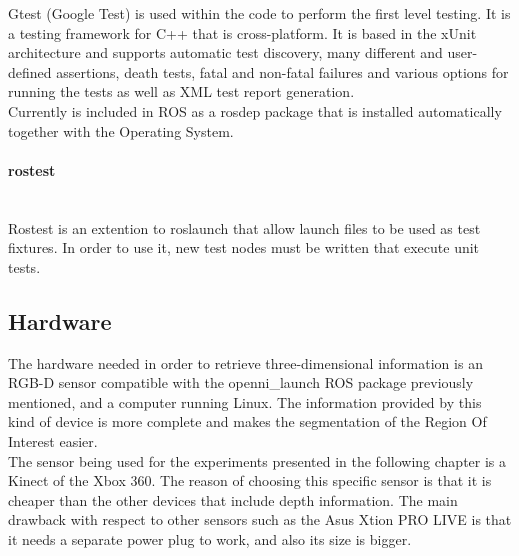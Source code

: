 		\label{gtest}
		Gtest (Google Test) is used within the code to perform the first level testing. It is a testing framework for C++ that is cross-platform. It is based in the xUnit architecture and supports automatic test discovery, many different and user-defined assertions, death tests, fatal and non-fatal failures and various options for running the tests as well as XML test report generation. 
		\\

		Currently is included in ROS as a rosdep package that is installed automatically together with the Operating System. 


		\paragraph{rostest}\mbox{} \\

		\label{rostest}
		Rostest is an extention to roslaunch that allow launch files to be used as test fixtures. 
		In order to use it, new test nodes must be written that execute unit tests. 


	\subsection{Hardware}
		\label{technologies_hardware}

		The hardware needed in order to retrieve three-dimensional information is an RGB-D sensor compatible with the openni\_launch ROS package previously mentioned, and a computer running Linux. The information provided by this kind of device is more complete and makes the segmentation of the Region Of Interest easier. \\

		The sensor being used for the experiments presented in the following chapter is a Kinect of the Xbox 360. The reason of choosing this specific sensor is that it is cheaper than the other devices that include depth information. The main drawback with respect to other sensors such as the Asus Xtion PRO LIVE\cite{xtion} is that it needs a separate power plug to work, and also its size is bigger. 
		\\



